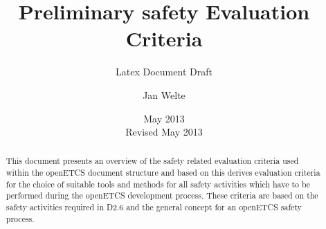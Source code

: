 \documentclass{template/openetcs_article}
\begin{document}
\frontmatter
{}




\title{Preliminary safety Evaluation Criteria}

\subtitle{Latex Document Draft}

\date{May 2013\\Revised May 2013}


\author{Jan Welte}





\begin{abstract}
  This document presents an overview of the safety related evaluation criteria used within the openETCS document structure and based on this derives evaluation criteria for the choice of suitable tools and methods for all safety activities which have to be performed during the openETCS development process. These criteria are based on the safety activities required in D2.6 and the general concept for an openETCS safety process. 
\end{abstract}

\maketitle
\tableofcontents
\listoffiguresandtables
\newpage

\end{document}
